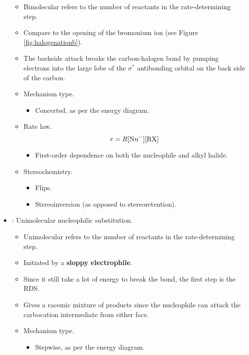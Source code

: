 \documentclass[../notes.tex]{subfiles}
\begin{document}
\begin{itemize}
\begin{itemize}
        \item Bimolecular refers to the number of reactants in the rate-determining step.
        \item Compare to the opening of the bromonium ion (see Figure \ref{fig:halogenationb}).
        \item The backside attack breaks the carbon-halogen bond by pumping electrons into the large lobe of the $\sigma^*$ antibonding orbital on the back side of the carbon.
        \item Mechanism type.
        \begin{itemize}
            \item Concerted, as per the energy diagram.
        \end{itemize}
        \item Rate law.
        \begin{equation*}
            r = R[\ce{Nu-}][\ce{RX}]
        \end{equation*}
        \begin{itemize}
            \item First-order dependence on both the nucleophile and alkyl halide.
        \end{itemize}
        \item Stereochemistry.
        \begin{itemize}
            \item Flips.
            \item Stereoinversion (as opposed to stereoretention).
        \end{itemize}
    \end{itemize}
    \item \textbf{}: Unimolecular nucleophilic substitution.
    \begin{itemize}
        \item Unimolecular refers to the number of reactants in the rate-determining step.
        \item Initiated by a \textbf{sloppy electrophile}.
        \item Since it still take a lot of energy to break the  bond, the first step is the RDS.
        \item Gives a racemic mixture of products since the nucleophile can attack the carbocation intermediate from either face.
        \item Mechanism type.
        \begin{itemize}
            \item Stepwise, as per the energy diagram.

\end{itemize}
\end{itemize}
\end{itemize}
\end{document}
